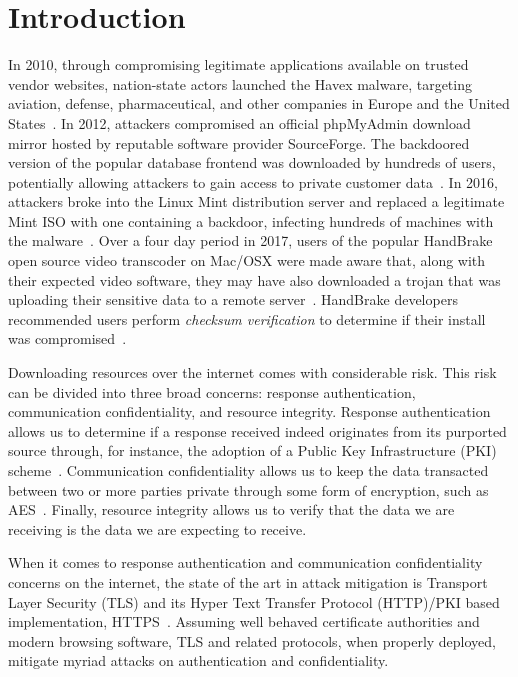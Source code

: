\section{Introduction} \label{sec:introduction}

In 2010, through compromising legitimate applications available on trusted
vendor websites, nation-state actors launched the Havex malware, targeting
aviation, defense, pharmaceutical, and other companies in Europe and the United
States~\cite{SCA-HAVEX1, SCA-HAVEX2}. In 2012, attackers compromised an official
phpMyAdmin download mirror hosted by reputable software provider SourceForge.
The backdoored version of the popular database frontend was downloaded by
hundreds of users, potentially allowing attackers to gain access to private
customer data~\cite{SCA-PMA1, SCA-PMA2}. In 2016, attackers broke into the Linux
Mint distribution server and replaced a legitimate Mint ISO with one containing
a backdoor, infecting hundreds of machines with the malware~\cite{SCA-MINT1,
SCA-MINT2}. Over a four day period in 2017, users of the popular HandBrake open
source video transcoder on Mac/OSX were made aware that, along with their
expected video software, they may have also downloaded a trojan that was
uploading their sensitive data to a remote server~\cite{SCA-HB1}. HandBrake
developers recommended users perform \emph{checksum verification} to determine
if their install was compromised~\cite{SCA-HB2}.

Downloading resources over the internet comes with considerable risk. This risk
can be divided into three broad concerns: response authentication, communication
confidentiality, and resource integrity. Response authentication allows us to
determine if a response received indeed originates from its purported source
through, for instance, the adoption of a Public Key Infrastructure (PKI)
scheme~\cite{PKI}. Communication confidentiality allows us to keep the data
transacted between two or more parties private through some form of encryption,
such as AES~\cite{AES}. Finally, resource integrity allows us to verify that the
data we are receiving is the data we are expecting to receive.

When it comes to response authentication and communication confidentiality
concerns on the internet, the state of the art in attack mitigation is Transport
Layer Security (TLS) and its Hyper Text Transfer Protocol (HTTP)/PKI based
implementation, HTTPS~\cite{TLS1.2, TLS1, TLS0, HTTPS, PKI}. Assuming well
behaved certificate authorities and modern browsing software, TLS and related
protocols, when properly deployed, mitigate myriad attacks on authentication and
confidentiality.

